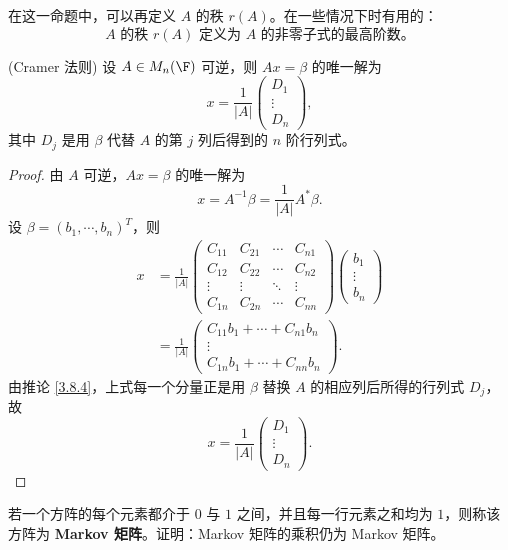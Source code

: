在这一命题中，可以再定义 $A$ 的秩 $r(A)$。在一些情况下时有用的：
\[
\text{$A$ 的秩 }r(A)\text{ 定义为 $A$ 的非零子式的最高阶数。}
\]

\begin{proposition}(Cramer 法则)\label{3.9.3}
	设 $A\in M_n(\F)$ 可逆，则 $Ax=\beta$ 的唯一解为
	\[
	x=\frac{1}{|A|}
	\begin{pmatrix}
		D_1\\
		\vdots\\
		D_n
	\end{pmatrix},
	\]
	其中 $D_j$ 是用 $\beta$ 代替 $A$ 的第 $j$ 列后得到的 $n$ 阶行列式。
\end{proposition}

\begin{proof}
	由 $A$ 可逆，$Ax=\beta$ 的唯一解为
	\[
	x=A^{-1}\beta
	=\frac{1}{|A|}A^*\beta.
	\]
	设 $\beta=(b_1,\cdots,b_n)^T$，则
	\[
	\begin{aligned}
		x
		&=\frac{1}{|A|}
		\begin{pmatrix}
			C_{11}&C_{21}&\cdots&C_{n1}\\
			C_{12}&C_{22}&\cdots&C_{n2}\\
			\vdots&\vdots&\ddots&\vdots\\
			C_{1n}&C_{2n}&\cdots&C_{nn}
		\end{pmatrix}
		\begin{pmatrix}
			b_1\\
			\vdots\\
			b_n
		\end{pmatrix}\\
		&=\frac{1}{|A|}
		\begin{pmatrix}
			C_{11}b_1+\cdots+C_{n1}b_n\\
			\vdots\\
			C_{1n}b_1+\cdots+C_{nn}b_n
		\end{pmatrix}.
	\end{aligned}
	\]
	由推论 \ref{3.8.4}，上式每一个分量正是用 $\beta$ 替换 $A$ 的相应列后所得的行列式 $D_j$，故
	\[
	x=\frac{1}{|A|}
	\begin{pmatrix}
		D_1\\
		\vdots\\
		D_n
	\end{pmatrix}.
	\]
\end{proof}

\begin{problem}
 若一个方阵的每个元素都介于 $0$ 与 $1$ 之间，并且每一行元素之和均为 $1$，则称该方阵为 \textbf{Markov 矩阵}。证明：Markov 矩阵的乘积仍为 Markov 矩阵。
\end{problem}


